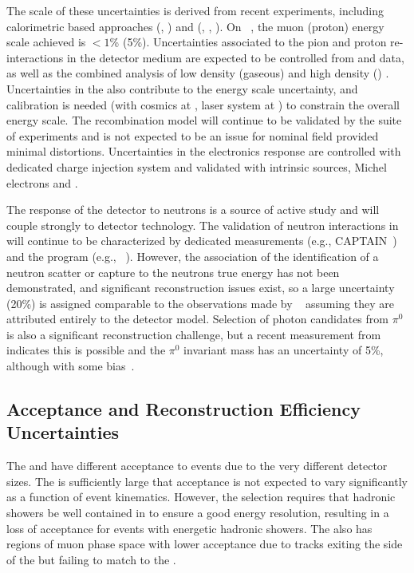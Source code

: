 The scale of these uncertainties is derived from recent experiments, including calorimetric based approaches (, ) and  (, , ). On ~\cite{NOvA:2018gge}, the muon (proton) energy scale achieved is $<1$\% (5\%). Uncertainties associated to the pion and proton re-interactions in the detector medium are expected to be controlled from  and  data, as well as the combined analysis of low density (gaseous) and high density () . Uncertainties in the \efield also contribute to the energy scale uncertainty, and calibration is needed (with cosmics at , laser system at ) to constrain the overall energy scale. The recombination model will continue to be validated by the suite of  experiments and is not expected to be an issue for nominal field provided minimal \efield distortions. Uncertainties in the electronics response are controlled with dedicated charge injection system and validated with intrinsic sources, Michel electrons and .

The response of the detector to neutrons is a source of active study and will couple strongly to detector technology. The validation of neutron interactions in  will continue to be characterized by dedicated measurements (e.g., CAPTAIN~\cite{Berns:2013usa,Bhandari:2019rat}) and the  program (e.g., ~\cite{PhysRevD.99.012002}).  However, the association of the identification of a neutron scatter or capture to the neutrons true energy has not been demonstrated, and significant reconstruction issues exist, so a large uncertainty (20\%) is assigned comparable to the observations made by ~\cite{Elkins:2019vmy} assuming they are attributed entirely to the detector model. Selection of photon candidates from $\pi^0$ is also a significant reconstruction challenge, but a recent measurement from  indicates this is possible and the $\pi^0$ invariant mass has an uncertainty of 5\%, although with some bias~\cite{Adams:2018sgn}.

\subsection{Acceptance and Reconstruction Efficiency Uncertainties}

The  and  have different acceptance to  events due to the very different detector sizes. The  is sufficiently large that acceptance is not expected to vary significantly as a function of event kinematics. However, the  selection requires that hadronic showers be well contained in  to ensure a good energy resolution, resulting in a loss of acceptance for events with energetic hadronic showers. The  also has regions of muon phase space with lower acceptance due to tracks exiting the side of the  but failing to match to the .

